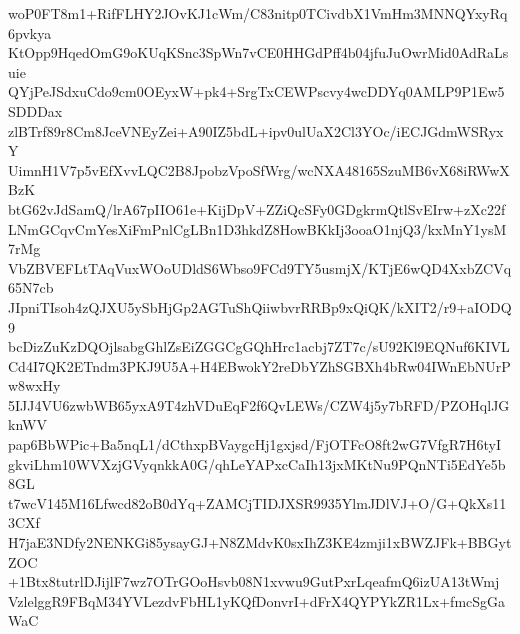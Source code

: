 woP0FT8m1+RifFLHY2JOvKJ1cWm/C83nitp0TCivdbX1VmHm3MNNQYxyRq6pvkya
KtOpp9HqedOmG9oKUqKSnc3SpWn7vCE0HHGdPff4b04jfuJuOwrMid0AdRaLsuie
QYjPeJSdxuCdo9cm0OEyxW+pk4+SrgTxCEWPscvy4wcDDYq0AMLP9P1Ew5SDDDax
zlBTrf89r8Cm8JceVNEyZei+A90IZ5bdL+ipv0ulUaX2Cl3YOc/iECJGdmWSRyxY
UimnH1V7p5vEfXvvLQC2B8JpobzVpoSfWrg/wcNXA48165SzuMB6vX68iRWwXBzK
btG62vJdSamQ/lrA67pIIO61e+KijDpV+ZZiQcSFy0GDgkrmQtlSvEIrw+zXc22f
LNmGCqvCmYesXiFmPnlCgLBn1D3hkdZ8HowBKkIj3ooaO1njQ3/kxMnY1ysM7rMg
VbZBVEFLtTAqVuxWOoUDldS6Wbso9FCd9TY5usmjX/KTjE6wQD4XxbZCVq65N7cb
JIpniTIsoh4zQJXU5ySbHjGp2AGTuShQiiwbvrRRBp9xQiQK/kXIT2/r9+aIODQ9
bcDizZuKzDQOjlsabgGhlZsEiZGGCgGQhHrc1acbj7ZT7c/sU92Kl9EQNuf6KIVL
Cd4I7QK2ETndm3PKJ9U5A+H4EBwokY2reDbYZhSGBXh4bRw04IWnEbNUrPw8wxHy
5IJJ4VU6zwbWB65yxA9T4zhVDuEqF2f6QvLEWs/CZW4j5y7bRFD/PZOHqlJGknWV
pap6BbWPic+Ba5nqL1/dCthxpBVaygcHj1gxjsd/FjOTFcO8ft2wG7VfgR7H6tyI
gkviLhm10WVXzjGVyqnkkA0G/qhLeYAPxcCaIh13jxMKtNu9PQnNTi5EdYe5b8GL
t7wcV145M16Lfwcd82oB0dYq+ZAMCjTIDJXSR9935YlmJDlVJ+O/G+QkXs113CXf
H7jaE3NDfy2NENKGi85ysayGJ+N8ZMdvK0sxIhZ3KE4zmji1xBWZJFk+BBGytZOC
+1Btx8tutrlDJijlF7wz7OTrGOoHsvb08N1xvwu9GutPxrLqeafmQ6izUA13tWmj
VzlelggR9FBqM34YVLezdvFbHL1yKQfDonvrI+dFrX4QYPYkZR1Lx+fmcSgGaWaC
